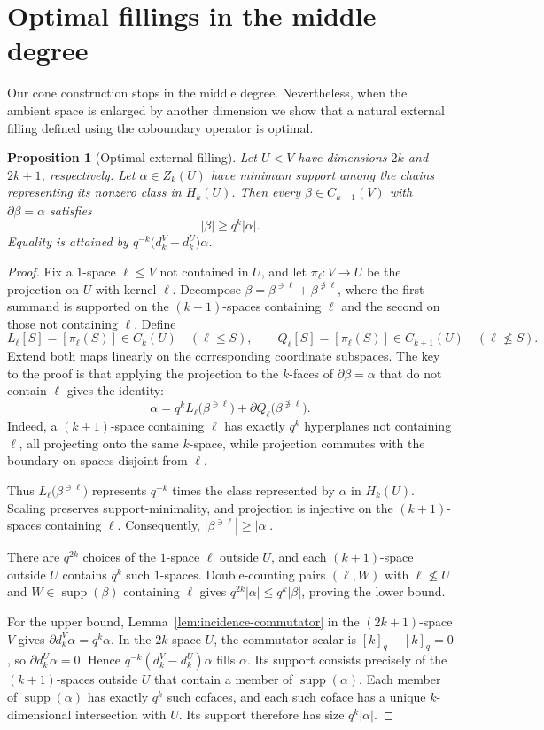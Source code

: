 \documentclass[11pt]{article}
\numberwithin{equation}{section}
\newtheorem{proposition}[theorem]{Proposition}
\newcommand{\supp}{\operatorname{supp}}
\begin{document}
\section{Optimal fillings in the middle degree}

Our cone construction stops in the middle degree. Nevertheless, when the ambient space is enlarged by another dimension we show that a natural external filling defined using the coboundary operator is optimal.
\begin{proposition}[Optimal external filling]
\label{prop:optimal-external-filling}
Let $U<V$ have dimensions $2k$ and $2k+1$, respectively. Let
$\alpha\in Z_k(U)$ have minimum support among the chains representing
its nonzero class in $H_k(U)$. Then every
$\beta\in C_{k+1}(V)$ with $\partial\beta=\alpha$ satisfies
\[
 |\beta|\ge q^k|\alpha|.
\]
Equality is attained by
$q^{-k}\bigl(d_k^V-d_k^U\bigr)\alpha$.
\end{proposition}


\begin{proof}
Fix a $1$-space $\ell\le V$ not contained in $U$, and let
$\pi_\ell:V\to U$ be the projection on $U$ with kernel $\ell$. Decompose
$\beta=\beta^{\ni\ell}+\beta^{\not\ni\ell}$, where the first summand
is supported on the $(k+1)$-spaces containing $\ell$ and the second
on those not containing $\ell$. Define
\[
 L_\ell[S]=[\pi_\ell(S)]\in C_k(U)
 \quad(\ell\le S),
 \qquad
 Q_\ell[S]=[\pi_\ell(S)]\in C_{k+1}(U)
 \quad(\ell\nleq S).
\]
Extend both maps linearly on the corresponding coordinate subspaces.
The key to the proof is that applying the projection to the $k$-faces of
$\partial\beta=\alpha$ that do not contain $\ell$ gives the identity:
\[
 \alpha
 =
 q^kL_\ell\bigl(\beta^{\ni\ell}\bigr)
 +
 \partial Q_\ell\bigl(\beta^{\not\ni\ell}\bigr).
\]
Indeed, a $(k+1)$-space containing $\ell$ has exactly $q^k$
hyperplanes not containing $\ell$, all projecting onto the same
$k$-space, while projection commutes with the boundary on spaces
disjoint from $\ell$.

Thus $L_\ell\bigl(\beta^{\ni\ell}\bigr)$ represents $q^{-k}$ times
the class represented by $\alpha$ in $H_k(U)$. Scaling preserves
support-minimality, and projection is injective on the $(k+1)$-spaces
containing $\ell$. Consequently, $|\beta^{\ni\ell}|\ge|\alpha|$.

There are $q^{2k}$ choices of the $1$-space $\ell$ outside $U$, and
each $(k+1)$-space outside $U$ contains $q^k$ such $1$-spaces.
Double-counting pairs $(\ell,W)$ with $\ell\nleq U$ and
$W\in\supp(\beta)$ containing $\ell$ gives
$q^{2k}|\alpha|\le q^k|\beta|$, proving the lower bound.

For the upper bound, Lemma~\ref{lem:incidence-commutator} in the
$(2k+1)$-space $V$ gives
$\partial d_k^V\alpha=q^k\alpha$. In the $2k$-space $U$, the
commutator scalar is $[k]_q-[k]_q=0$, so
$\partial d_k^U\alpha=0$. Hence
$q^{-k}(d_k^V-d_k^U)\alpha$ fills $\alpha$.
Its support consists precisely of the $(k+1)$-spaces outside $U$
that contain a member of $\supp(\alpha)$.
Each member of $\supp(\alpha)$ has exactly $q^k$ such cofaces, and
each such coface has a unique $k$-dimensional intersection with
$U$. Its support therefore has size $q^k|\alpha|$.
\end{proof}
\end{document}
